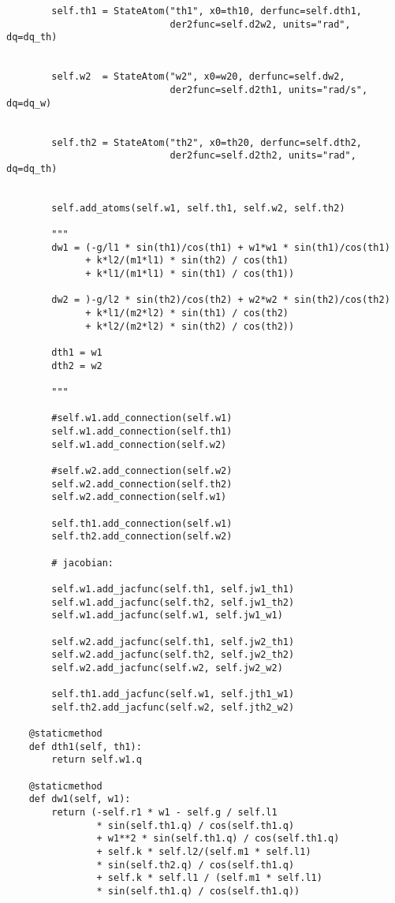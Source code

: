 \begin{lstlisting}
        self.th1 = StateAtom("th1", x0=th10, derfunc=self.dth1,
                             der2func=self.d2w2, units="rad", dq=dq_th)


        self.w2  = StateAtom("w2", x0=w20, derfunc=self.dw2,
                             der2func=self.d2th1, units="rad/s", dq=dq_w)


        self.th2 = StateAtom("th2", x0=th20, derfunc=self.dth2,
                             der2func=self.d2th2, units="rad", dq=dq_th)


        self.add_atoms(self.w1, self.th1, self.w2, self.th2)

        """
        dw1 = (-g/l1 * sin(th1)/cos(th1) + w1*w1 * sin(th1)/cos(th1)
              + k*l2/(m1*l1) * sin(th2) / cos(th1)
              + k*l1/(m1*l1) * sin(th1) / cos(th1))

        dw2 = )-g/l2 * sin(th2)/cos(th2) + w2*w2 * sin(th2)/cos(th2)
              + k*l1/(m2*l2) * sin(th1) / cos(th2)
              + k*l2/(m2*l2) * sin(th2) / cos(th2))

        dth1 = w1
        dth2 = w2

        """

        #self.w1.add_connection(self.w1)
        self.w1.add_connection(self.th1)
        self.w1.add_connection(self.w2)

        #self.w2.add_connection(self.w2)
        self.w2.add_connection(self.th2)
        self.w2.add_connection(self.w1)

        self.th1.add_connection(self.w1)
        self.th2.add_connection(self.w2)

        # jacobian:

        self.w1.add_jacfunc(self.th1, self.jw1_th1)
        self.w1.add_jacfunc(self.th2, self.jw1_th2)
        self.w1.add_jacfunc(self.w1, self.jw1_w1)

        self.w2.add_jacfunc(self.th1, self.jw2_th1)
        self.w2.add_jacfunc(self.th2, self.jw2_th2)
        self.w2.add_jacfunc(self.w2, self.jw2_w2)

        self.th1.add_jacfunc(self.w1, self.jth1_w1)
        self.th2.add_jacfunc(self.w2, self.jth2_w2)

    @staticmethod
    def dth1(self, th1):
        return self.w1.q

    @staticmethod
    def dw1(self, w1):
        return (-self.r1 * w1 - self.g / self.l1
                * sin(self.th1.q) / cos(self.th1.q)
                + w1**2 * sin(self.th1.q) / cos(self.th1.q)
                + self.k * self.l2/(self.m1 * self.l1)
                * sin(self.th2.q) / cos(self.th1.q)
                + self.k * self.l1 / (self.m1 * self.l1)
                * sin(self.th1.q) / cos(self.th1.q))


\end{lstlisting}
